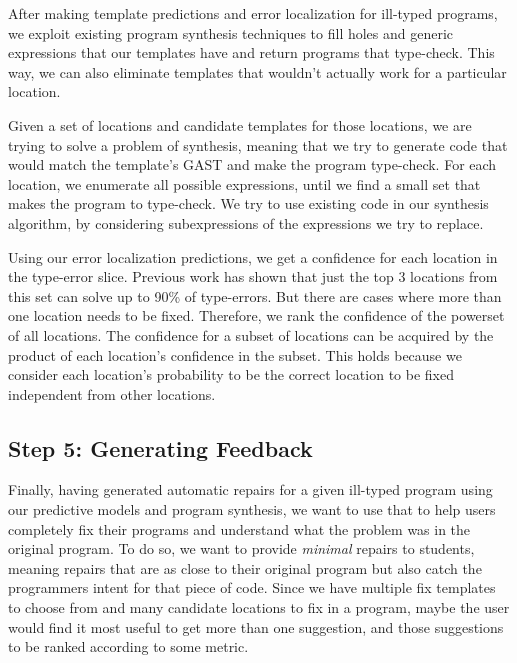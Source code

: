 After making template predictions and error localization for ill-typed programs, we exploit existing program synthesis
techniques to fill holes and generic expressions that our templates have and return programs that type-check. This way,
we can also eliminate templates that wouldn’t actually work for a particular location.

 Given a set of locations and candidate templates for those locations, we are trying to solve
a problem of synthesis, meaning that we try to generate code that would match the template’s GAST and make the program
type-check. For each location, we enumerate all possible expressions, until we find a small set that makes the program
to type-check. We try to use existing code in our synthesis algorithm, by considering subexpressions of the expressions
we try to replace.

 Using our error localization predictions, we get a confidence for each
location in the type-error slice. Previous work has shown that just the top 3 locations from this set can solve up to
90\% of type-errors. But there are cases where more than one location needs to be fixed. Therefore, we rank the
confidence of the powerset of all locations. The confidence for a subset of locations can be acquired by the product of
each location’s confidence in the subset. This holds because we consider each location’s probability to be the correct
location to be fixed independent from other locations.



\subsection{Step 5: Generating Feedback}
\label{subsec:step5}

Finally, having generated automatic repairs for a given ill-typed program using our predictive models and program
synthesis, we want to use that to help users completely fix their programs and understand what the problem was in the
original program. To do so, we want to provide \emph{minimal} repairs to students, meaning repairs that are as close to
their original program but also catch the programmers intent for that piece of code. Since we have multiple fix
templates to choose from and many candidate locations to fix in a program, maybe the user would find it most useful to
get more than one suggestion, and those suggestions to be ranked according to some metric.

